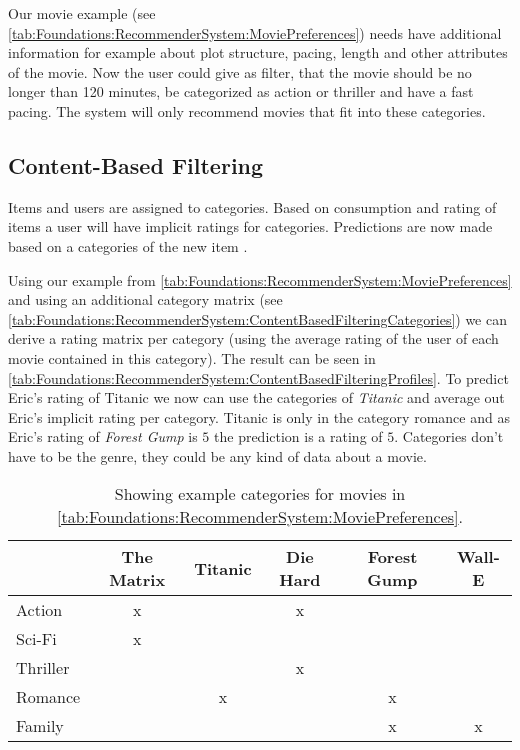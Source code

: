Our movie example (see \autoref{tab:Foundations:RecommenderSystem:MoviePreferences}) needs have additional information for example about plot structure, pacing, length and other attributes of the movie. Now the user could give as filter, that the movie should be no longer than 120 minutes, be categorized as action or thriller and have a fast pacing. The system will only recommend movies that fit into these categories.

\subsection{Content-Based Filtering}
Items and users are assigned to categories. Based on consumption and rating of items a user will have implicit ratings for categories. Predictions are now made based on a categories of the new item \cite[~ pp. 10, 11]{felfernigDecisionTasksBasic2018}.

Using our example from \autoref{tab:Foundations:RecommenderSystem:MoviePreferences} and using an additional category matrix (see \autoref{tab:Foundations:RecommenderSystem:ContentBasedFilteringCategories}) we can derive a rating matrix per category (using the average rating of the user of each movie contained in this category). The result can be seen in \autoref{tab:Foundations:RecommenderSystem:ContentBasedFilteringProfiles}. To predict Eric's rating of Titanic we now can use the categories of \textit{Titanic} and average out Eric's implicit rating per category. Titanic is only in the category romance and as Eric's rating of \textit{Forest Gump} is $5$ the prediction is a rating of $5$. Categories don't have to be the genre, they could be any kind of data about a movie.

\begin{table}
    \centering    
    \begin{tabular}{ l | c | c | c | c | c }
        & The Matrix & Titanic & Die Hard & Forest Gump & Wall-E \\ \hline
         Action  & x &  & x  &  &  \\
         Sci-Fi  & x &  &  &  &  \\
         Thriller  &  & & x &  &  \\
         Romance & & x & & x & \\
         Family & & & & x & x \\
    \end{tabular}
    \caption{Showing example categories for movies in \autoref{tab:Foundations:RecommenderSystem:MoviePreferences}.}
    
    \label{tab:Foundations:RecommenderSystem:ContentBasedFilteringCategories}
\end{table}

